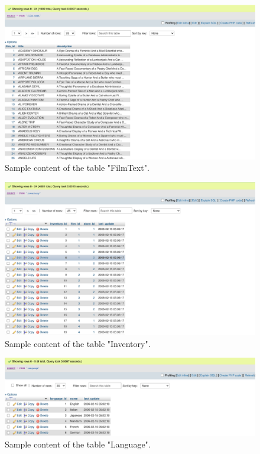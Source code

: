 \documentclass[openany]{article}
\begin{document}
		\begin{figure}[H]
			\includegraphics[width=\textwidth]{filmtext_content}
			\caption{Sample content of the table "Film\textunderscore Text".}
		\end{figure}
		\begin{figure}[H]
			\includegraphics[width=\textwidth]{inventory_content}
			\caption{Sample content of the table "Inventory".}
		\end{figure}
		\begin{figure}[H]
			\includegraphics[width=\textwidth]{language_content}
			\caption{Sample content of the table "Language".}
		\end{figure}
\end{document}
